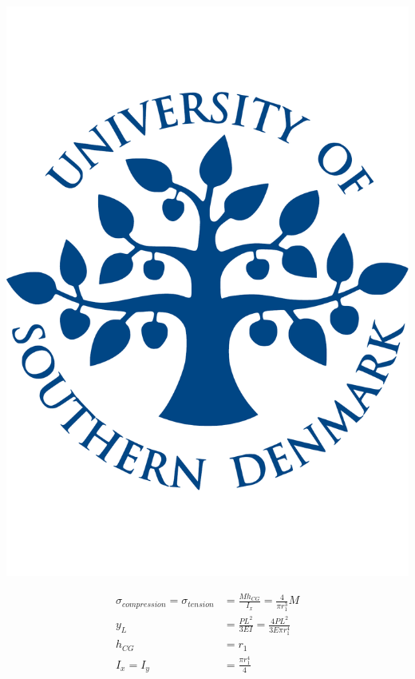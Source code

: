   \noindent\begin{minipage}{0.2\textwidth}%
      \includegraphics[width=\linewidth]{figures/sdu_logo.pdf}
  \end{minipage}%
  \hfill%
  \begin{minipage}{0.8\textwidth}
    \begin{equation}
    \begin{aligned}
      \sigma _{compression} = \sigma _{tension} &= \frac{M h_{CG}}{I_x} = \frac{4}{\pi r_1 ^3} M\\
      y_L &= \frac{P L^2}{3EI} = \frac{4 P L^2}{3 E \pi r_1 ^4}\\
      h_{CG} &= r_1 \\
      I_x = I_y &= \frac{\pi r_1 ^4}{4}
      \end{aligned}
    \end{equation}
  \end{minipage}

